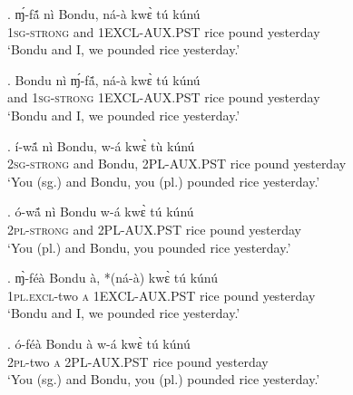 \documentclass{assets/fieldnotes}
\begin{document}

\exg. ɱ́-fã́ nì Bondu, ná-à kwɛ̀ tú kúnú\\
\textsc{1sg-strong} and {} \textsc{1EXCL-AUX.PST} rice pound yesterday\\
`Bondu and I, we pounded rice yesterday.’

\exg. Bondu nì ɱ́-fã́, ná-à kwɛ̀ tú kúnú\\
{} and \textsc{1sg-strong} \textsc{1EXCL-AUX.PST} rice pound yesterday\\
`Bondu and I, we pounded rice yesterday.’

\exg. í-wã́ nì Bondu, w-á kwɛ̀ tù kúnú\\
\textsc{2sg-strong} and Bondu, \textsc{2PL-AUX.PST} rice pound yesterday\\
`You (sg.) and Bondu, you (pl.) pounded rice yesterday.’

\exg. ó-wã́ nì Bondu w-á kwɛ̀ tú kúnú\\
\textsc{2pl-strong} and {} \textsc{2PL-AUX.PST} rice pound yesterday\\
`You (pl.) and Bondu, you pounded rice yesterday.’


\exg. ɱ̀-féà Bondu à, *(ná-à) kwɛ̀ tú kúnú\\
\textsc{1pl.excl}-two {} \textsc{a} \textsc{1EXCL-AUX.PST} rice pound yesterday\\
`Bondu and I, we pounded rice yesterday.’\label{bondu_and_i}

\exg. ó-féà Bondu à w-á kwɛ̀ tú kúnú\\
\textsc{2pl}-two {} \textsc{a} \textsc{2PL-AUX.PST} rice pound yesterday\\
`You (sg.) and Bondu, you (pl.) pounded rice yesterday.’\label{you_and_bondu}
\end{document}
